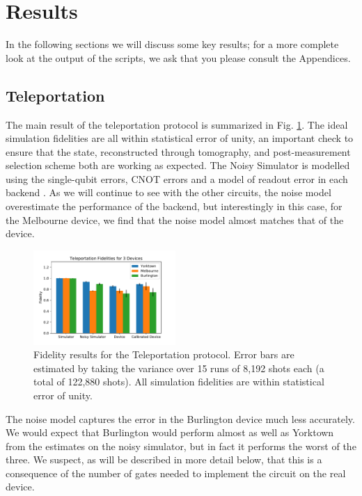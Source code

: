 \section{Results}

In the following sections we will discuss some key results;
for a more complete look at the output of the scripts, we ask that you please
consult the Appendices.

\subsection{Teleportation}

The main result of the teleportation protocol is
summarized in Fig. \ref{fig:teleport_histogram}. The ideal simulation fidelities
are all within statistical error of unity, an important check to ensure that the
state, reconstructed through tomography, and post-measurement selection scheme
both are working as expected. The Noisy Simulator is modelled using the
single-qubit errors, CNOT errors and a model of readout error in each backend
\cite{qiskit_org}. As we will continue to see with the other circuits, the noise
model overestimate the performance of the backend, but interestingly in this
case, for the Melbourne device, we find that the noise model almost matches that
of the device.

\begin{figure}[h] \centering
	\includegraphics[width=0.48\textwidth]{images/results/teleport_histogram.pdf}
	\caption{Fidelity results for the Teleportation protocol. Error bars are
		estimated by taking the variance over 15 runs of 8,192 shots each (a total of
		122,880 shots). All simulation fidelities are within statistical error of
		unity.}
	\label{fig:teleport_histogram}
\end{figure}

The noise model captures the error in the Burlington device much less
accurately. We would expect that Burlington would perform almost as well as
Yorktown from the estimates on the noisy simulator, but in fact it performs the
worst of the three. We suspect, as will be described in more detail below, that
this is a consequence of the number of gates needed to implement the circuit on
the real device.

